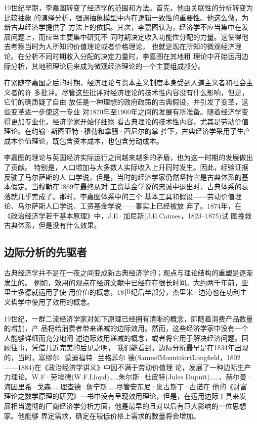 19世纪早期，李嘉图转变了经济学的范围和方法。首先，他由关联性的分析转变为比较抽象
的演绎分析，强调抽象模型中内在逻辑一致性的重要性。他这么做，为新古典经济学提供了
方法上的依据。其次，李嘉图认为，经济学不应当集中在发展问题上，而应当主要集中研究不
同时期决定收入功能性分配的力量。这使得他去考察当时为人所知的价值理论或者价格理论，
也就是现在所知的微观经济理论。在分析不同时期收入分配的决定力量时，李嘉图在其地租
理论中开始运用边际分析，其地租理论后来成为微观经济理论的一个主要组成部分。

在紧随李嘉图之后的时期，经济理论与资本主义制度本身受到人道主义者和社会主义者的许
多批评。尽管这些批评对经济理论的技术性内容没有什么影响，但是，它们的确质疑了自由
放任是一种理想的政府政策的古典假设，并引发了变革，这些变革进一步使这一专业
对1870年至1900年之间的发展有所准备。随着经济学变得更加专业化，经济学家开始仔细察
看古典理论的技术性内容，尤其是劳动价值理论。在约输·斯图亚特·穆勒和拿骚·西尼尔的掌
控下，古典经济学采用了生产成本价值理论，既包含资本成本，也包含劳动成本。

李嘉图的理论与英国经济实际运行之间越来越多的矛盾，也为这一时期的发展做出了贡献。
特别是，人口增加与大多数人实际收入上升同时发生。因此，经验证据反驶了马尔萨斯的人
口学说，但是，当时的经济学家仍然坚持它是古典体系的基本假定。当穆勒在1869年最终从对
工资基金学说的忠诚中退出时，古典体系的衰落就几乎完成了。那时，李嘉图体系中的三个
基本工具和假设——劳动价值理论、马尔萨斯人口学说、工资基金学说——事实上已经被放
弃了。1874年，在《政治经济学若干基本原理》中，J.E·加尼斯(J.E.Caimes，1823--1875)试
图挽救古典体系，但是没有什么效果。

\subsection{边际分析的先驱者}

古典经济学并不是在一夜之间变成新古典经济学的；观点与理论结构的重塑是逐渐发生的。
例如，效用的观点在经济文献中已经存在很长时间。大约两千年前，亚里士多德就运用了使
用价值的概念，18世纪后半部分，杰里米·边沁也在功利主义哲学中使用了效用的概念。

19世纪，一群二流经济学家对如下原理已经拥有清晰的概念，即随着消费产品数量的增加，产
品将给消费者带来递减的边际效用。然而，这些经济学家中没有一个人能够详细而充分地阐
述边际效用递减的概念，或者将它用于解决经济问题。回顾往事，凭借几近完美的后见之明，
我们能看到，边际分析最早是在1834年出现的，当时，塞缪尔·蒙迪福特·兰格菲尔
德(SamuelMountifortLongfield，1802——1884)在《政治经济学讲义》中因不满于劳动价值理
论，发展了一种边际生产力理论。W.F·劳埃德(W.F.Lloyd)……朱尔斯·杜皮特(Jules
Dupuit)……、赫尔曼·海因里希·戈森……理查德·詹宁斯……尽管安东尼·奥古斯丁·古诺在
他的《财富理论之数学原理的研究》一书中没有呈现效用理论，但是，在运用边际工具来发
展相当透彻的厂商经济学分析方面，他是最早的且对以后有巨大影响的一位思想家。他能够
界定需求，确定在较低价格上需求的数量将会增加。

